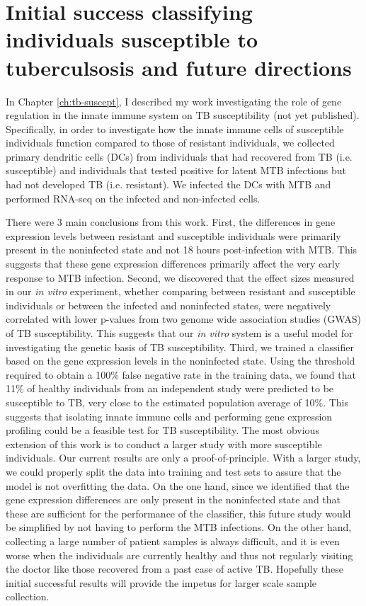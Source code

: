 \section{Initial success classifying individuals susceptible to tuberculsosis and future directions}

In Chapter \ref{ch:tb-suscept}, I described my work investigating the
role of gene regulation in the innate immune system on TB
susceptibility (not yet published). Specifically, in order to
investigate how the innate immune cells of susceptible individuals
function compared to those of resistant individuals, we collected
primary dendritic cells (DCs) from individuals that had recovered from
TB (i.e. susceptible) and individuals that tested positive for latent
MTB infections but had not developed TB (i.e. resistant). We infected
the DCs with MTB and performed RNA-seq on the infected and
non-infected cells.

There were 3 main conclusions from this work. First, the differences
in gene expression levels between resistant and susceptible
individuals were primarily present in the noninfected state and not 18
hours post-infection with MTB. This suggests that these gene
expression differences primarily affect the very early response to MTB
infection. Second, we discovered that the effect sizes measured in our
\emph{in vitro} experiment, whether comparing between resistant and
susceptible individuals or between the infected and noninfected
states, were negatively correlated with lower p-values from two genome
wide association studies (GWAS) of TB susceptibility. This suggests
that our \emph{in vitro} system is a useful model for investigating
the genetic basis of TB susceptibility. Third, we trained a classifier
based on the gene expression levels in the noninfected state. Using
the threshold required to obtain a 100\% false negative rate in the
training data, we found that 11\% of healthy individuals from an
independent study were predicted to be susceptible to TB, very close
to the estimated population average of 10\%. This suggests that
isolating innate immune cells and performing gene expression profiling
could be a feasible test for TB susceptibility.  The most obvious
extension of this work is to conduct a larger study with more
susceptible individuals. Our current results are only a
proof-of-principle. With a larger study, we could properly split the
data into training and test sets to assure that the model is not
overfitting the data. On the one hand, since we identified that the
gene expression differences are only present in the noninfected state
and that these are sufficient for the performance of the classifier,
this future study would be simplified by not having to perform the MTB
infections. On the other hand, collecting a large number of patient
samples is always difficult, and it is even worse when the individuals
are currently healthy and thus not regularly visiting the doctor like
those recovered from a past case of active TB. Hopefully these initial
successful results will provide the impetus for larger scale sample
collection.

